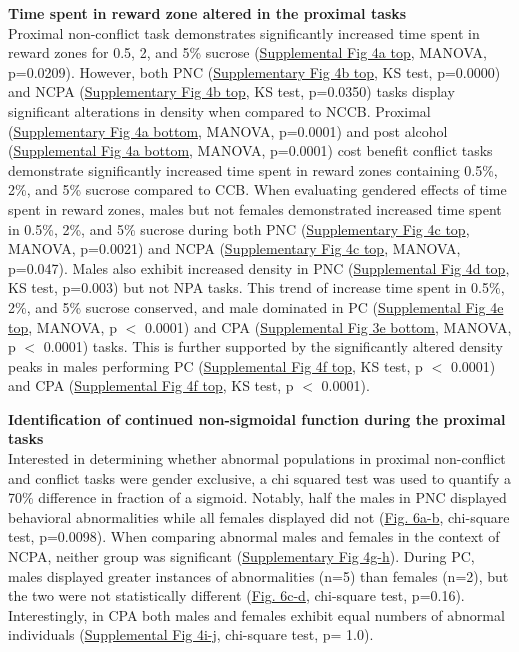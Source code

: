 \documentclass{article}
\begin{document}
\vspace{1em}

\noindent\textbf{Time spent in reward zone altered in the proximal tasks}\\
Proximal non-conflict task demonstrates significantly increased time spent in reward zones for 0.5, 2, and 5\% sucrose (\hyperref[fig:Alcohol_SI_4]{Supplemental Fig 4a top}, MANOVA, p=0.0209). However, both PNC (\hyperref[fig:Alcohol_SI_4]{Supplementary Fig 4b top}, KS test, p=0.0000) and NCPA (\hyperref[fig:Alcohol_SI_4]{Supplementary Fig 4b top}, KS test, p=0.0350) tasks display significant alterations in density when compared to NCCB. Proximal (\hyperref[fig:Alcohol_SI_4]{Supplementary Fig 4a bottom}, MANOVA, p=0.0001) and post alcohol (\hyperref[fig:Alcohol_SI_4]{Supplemental Fig 4a bottom}, MANOVA, p=0.0001) cost benefit conflict tasks demonstrate significantly increased time spent in reward zones containing 0.5\%, 2\%, and 5\% sucrose compared to CCB. When evaluating gendered effects of time spent in reward zones, males but not females demonstrated increased time spent in 0.5\%, 2\%, and 5\% sucrose during both PNC (\hyperref[fig:Alcohol_SI_4]{Supplementary Fig 4c top}, MANOVA, p=0.0021) and NCPA (\hyperref[fig:Alcohol_SI_4]{Supplementary Fig 4c top}, MANOVA, p=0.047). Males also exhibit increased density in PNC (\hyperref[fig:Alcohol_SI_4]{Supplemental Fig 4d top}, KS test, p=0.003) but not NPA tasks. This trend of increase time spent in 0.5\%, 2\%, and 5\% sucrose conserved, and male dominated in PC (\hyperref[fig:Alcohol_SI_4]{Supplemental Fig 4e top}, MANOVA, p $<$ 0.0001) and CPA (\hyperref[fig:Alcohol_SI_4]{Supplemental Fig 3e bottom}, MANOVA, p $<$ 0.0001) tasks. This is further supported by the significantly altered density peaks in males performing PC (\hyperref[fig:Alcohol_SI_4]{Supplemental Fig 4f top}, KS test, p $<$ 0.0001) and CPA (\hyperref[fig:Alcohol_SI_4]{Supplemental Fig 4f top}, KS test, p $<$ 0.0001).

\vspace{1em}

\noindent\textbf{Identification of continued non-sigmoidal function during the proximal tasks}\\
Interested in determining whether abnormal populations in proximal non-conflict and conflict tasks were gender exclusive, a chi squared test was used to quantify a 70\% difference in fraction of a sigmoid. Notably, half the males in PNC displayed behavioral abnormalities while all females displayed did not (\hyperref[fig:alcohol_main_6]{Fig. 6a-b}, chi-square test, p=0.0098). When comparing abnormal males and females in the context of NCPA, neither group was significant (\hyperref[fig:Alcohol_SI_4]{Supplementary Fig 4g-h}). During PC, males displayed greater instances of abnormalities (n=5) than females (n=2), but the two were not statistically different (\hyperref[fig:alcohol_main_6]{Fig. 6c-d}, chi-square test, p=0.16). Interestingly, in CPA both males and females exhibit equal numbers of abnormal individuals (\hyperref[fig:Alcohol_SI_4]{Supplemental Fig 4i-j}, chi-square test, p= 1.0).
\end{document}
